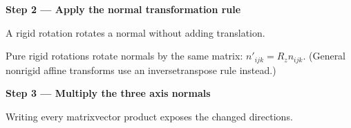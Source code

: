 \documentclass[letterpaper,11pt,english,openany,oneside]{jupyterBook}
\begin{document}
\par\medskip{}
{\color{QuizStepRed}\bfseries Step 2 — Apply the normal transformation rule}\par\smallskip

\sphinxAtStartPar
{} A rigid rotation rotates a normal without adding translation.

\sphinxAtStartPar
Pure rigid rotations rotate normals by the same matrix: {\color{QuizMathBlue} \(n'_{ijk}=R_zn_{ijk}\)}. (General nonrigid affine transforms use an inverse\sphinxhyphen{}transpose rule instead.)

\par

\par\medskip{}
{\color{QuizStepRed}\bfseries Step 3 — Multiply the three axis normals}\par\smallskip

\sphinxAtStartPar
{} Writing every matrix\sphinxhyphen{}vector product exposes the changed directions.
\end{document}
